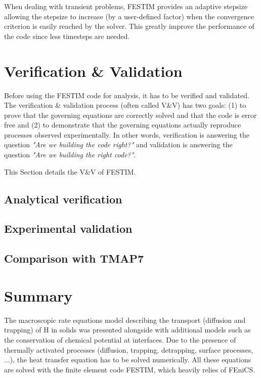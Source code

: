 When dealing with transient problems, FESTIM provides an adaptive stepsize allowing the stepsize to increase (by a user-defined factor) when the convergence criterion is easily reached by the solver.
This greatly improve the performance of the code since less timesteps are needed.



\section{Verification \& Validation}

Before using the FESTIM code for analysis, it has to be verified and validated.
The verification \& validation process (often called V\&V) has two goals: (1) to prove that the governing equations are correctly solved and that the code is error free and (2) to demonstrate that the governing equations actually reproduce processes observed experimentally.
In other words, verification is answering the question \textit{"Are we building the code right?"} and validation is answering the question \textit{"Are we building the right code?"}.

This Section details the V\&V of FESTIM.

\subsection{Analytical verification}



\subsection{Experimental validation}



\subsection{Comparison with TMAP7}



\section{Summary}

The macroscopic rate equations model describing the transport (diffusion and trapping) of H in solids was presented alongside with additional models such as the conservation of chemical potential at interfaces.
Due to the presence of thermally activated processes (diffusion, trapping, detrapping, surface processes, ...), the heat transfer equation has to be solved numerically.
All these equations are solved with the finite element code FESTIM, which heavily relies of FEniCS.

